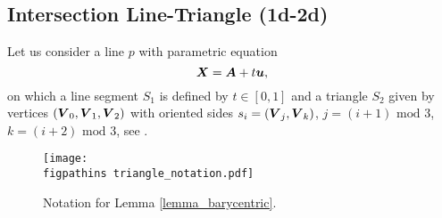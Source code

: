 


\subsection{Intersection Line-Triangle (1d-2d)}
\label{sec:1d-2d}
Let us consider a line $p$ with parametric equation 
\begin{equation}
    \label{eq:line_parametric}
    \mathbf{\boldsymbol{X}} = \mathbf{\boldsymbol{A}} + t\mathbf{\boldsymbol{u}},
\end{equation}
on which a line segment $S_1$ is defined by $t\in [0,1]$ and a triangle $S_2$ given by vertices $(\mathbf{\boldsymbol{V}}_0, \mathbf{\boldsymbol{V}}_1, \mathbf{\boldsymbol{V}}_2)$ 
with oriented sides $s_i=(\mathbf{\boldsymbol{V}}_j, \mathbf{\boldsymbol{V}}_k)$, $j=(i+1)\text{ mod }3$, $k=(i+2)\text{ mod }3$, see .

\begin{figure}[!htb]
    \centering
    \texttt{[image: \\figpathins triangle\_notation.pdf]}
    \caption{Notation for Lemma \ref{lemma_barycentric}.}
    \label{fig:triangle_notation}
\end{figure}

